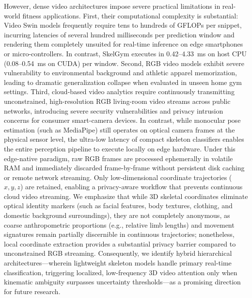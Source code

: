 \documentclass[preprint,12pt]{elsarticle}
\begin{document}
However, dense video architectures impose severe practical limitations in real-world fitness applications. First, their computational complexity is substantial: Video Swin models frequently require tens to hundreds of GFLOPs per snippet, incurring latencies of several hundred milliseconds per prediction window and rendering them completely unsuited for real-time inference on edge smartphones or micro-controllers. In contrast, SkelGym executes in 0.42--4.33~ms on host CPU (0.08--0.54~ms on CUDA) per window. Second, RGB video models exhibit severe vulnerability to environmental background and athletic apparel memorization, leading to dramatic generalization collapse when evaluated in unseen home gym settings. Third, cloud-based video analytics require continuously transmitting unconstrained, high-resolution RGB living-room video streams across public networks, introducing severe security vulnerabilities and privacy intrusion concerns for consumer smart-camera devices. In contrast, while monocular pose estimation (such as MediaPipe) still operates on optical camera frames at the physical sensor level, the ultra-low latency of compact skeleton classifiers enables the entire perception pipeline to execute locally on edge hardware. Under this edge-native paradigm, raw RGB frames are processed ephemerally in volatile RAM and immediately discarded frame-by-frame without persistent disk caching or remote network streaming. Only low-dimensional coordinate trajectories ($x, y, z$) are retained, enabling a privacy-aware workflow that prevents continuous cloud video streaming. We emphasize that while 3D skeletal coordinates eliminate optical identity markers (such as facial features, body textures, clothing, and domestic background surroundings), they are not completely anonymous, as coarse anthropometric proportions (e.g., relative limb lengths) and movement signatures remain partially discernible in continuous trajectories; nonetheless, local coordinate extraction provides a substantial privacy barrier compared to unconstrained RGB streaming. Consequently, we identify hybrid hierarchical architectures---wherein lightweight skeleton models handle primary real-time classification, triggering localized, low-frequency 3D video attention only when kinematic ambiguity surpasses uncertainty thresholds---as a promising direction for future research.
\end{document}

